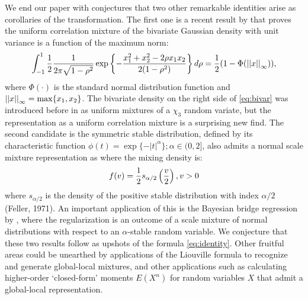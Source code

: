 \documentclass[letterpaper,11pt]{article}
\begin{document}
We end our paper with conjectures that two other remarkable identities arise as corollaries of the \CS transformation. The first one is a recent result by \cite{zhang2014uniform} that proves the uniform correlation mixture of the bivariate Gaussian density with unit variance is a function of the maximum norm: 
\begin{equation}
  \int_{-1}^{1} \frac{1}{2} \frac{1}{2\pi\sqrt{1-\rho^2}} \exp \left\{ - \frac{x_1^2 + x_2^2 - 2 \rho x_1 x_2}{2(1-\rho^2)} \right\} d \rho = 
  \frac{1}{2} (1- \Phi(\left|\left|x\right|\right|_{\infty})) \label{eq:bivar}, 
\end{equation}
where $\Phi(\cdot)$ is the standard normal distribution function and $\left|\left|x\right|\right|_{\infty} = \max \{ x_1, x_2\}$. The bivariate density on the right side of \eqref{eq:bivar} was introduced before in \cite{bryson1982constructing} as uniform mixtures of a $\chi_3$ random variate, but the representation as a uniform correlation mixture is a surprising new find. The second candidate is the symmetric stable distribution, defined by its characteristic function $\phi(t) = \exp\{ -|t|^{\alpha} \}; \alpha \in (0,2]$, also admits a normal scale mixture representation as where the mixing density is: 
$$
f(v) = \frac{1}{2} s_{\alpha/2} \left( \frac{v}{2} \right), v > 0 
$$
where $s_{\alpha/2}$ is the density of the positive stable distribution with index $\alpha / 2$ (Feller, 1971). An important application of this is the Bayesian bridge regression by \cite{polson2014bayesian}, where the regularization is an outcome of a scale mixture of normal distributions with respect to an $\alpha$-stable random variable. We conjecture that these two results follow as upshots of the \CS formula \eqref{eq:identity}. Other fruitful areas could be unearthed by applications of the Liouville formula to recognize and generate global-local mixtures, and other applications such as calculating higher-order `closed-form' moments $E(X^n)$ for random variables $X$ that admit a global-local representation. 



\end{document}
